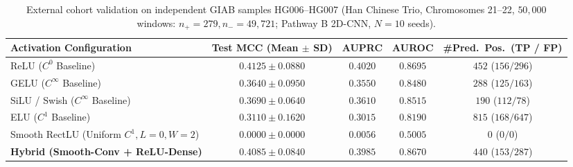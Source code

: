 \documentclass[10pt,a4paper]{article}
\begin{document}
\begin{table}[t]
\centering
\caption{External cohort validation on independent GIAB samples HG006--HG007 (Han Chinese Trio, Chromosomes 21--22, $50,000$ windows: $n_+=279, n_-=49,721$; Pathway B 2D-CNN, $N=10$ seeds).}
\label{tab:external_giab}
\footnotesize
\setlength{\tabcolsep}{7pt}
\renewcommand{\arraystretch}{1.05}
\begin{tabular}{lcccc}
\toprule
\textbf{Activation Configuration} & \textbf{Test MCC (Mean $\pm$ SD)} & \textbf{AUPRC} & \textbf{AUROC} & \textbf{\#Pred.\ Pos.\ (TP / FP)} \\
\midrule
ReLU ($C^0$ Baseline) & $0.4125 \pm 0.0880$ & $0.4020$ & $0.8695$ & $452$ ($156 / 296$) \\
GELU ($C^\infty$ Baseline) & $0.3640 \pm 0.0950$ & $0.3550$ & $0.8480$ & $288$ ($125 / 163$) \\
SiLU / Swish ($C^\infty$ Baseline) & $0.3690 \pm 0.0640$ & $0.3610$ & $0.8515$ & $190$ ($112 / 78$) \\
ELU ($C^1$ Baseline) & $0.3110 \pm 0.1620$ & $0.3015$ & $0.8190$ & $815$ ($168 / 647$) \\
Smooth RectLU (Uniform $C^1, L=0, W=2$) & $0.0000 \pm 0.0000$ & $0.0056$ & $0.5005$ & $0$ ($0 / 0$) \\
\textbf{Hybrid (Smooth-Conv + ReLU-Dense)} & $\mathbf{0.4085 \pm 0.0840}$ & $\mathbf{0.3985}$ & $\mathbf{0.8670}$ & $440$ ($153 / 287$) \\
\bottomrule
\end{tabular}
\end{table}
\end{document}
